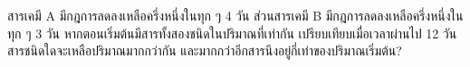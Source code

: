 ﻿%
\question สารเคมี A มีกฎการลดลงเหลือครึ่งหนึ่งในทุก ๆ 4 วัน ส่วนสารเคมี B มีกฎการลดลงเหลือครึ่งหนึ่งในทุก ๆ 3 วัน หากตอนเริ่มต้นมีสารทั้งสองชนิดในปริมาณที่เท่ากัน เปรียบเทียบเมื่อเวลาผ่านไป 12 วัน สารชนิดใดจะเหลือปริมาณมากกว่ากัน และมากกว่าอีกสารนึงอยู่กี่เท่าของปริมาณเริ่มต้น?
\newline
{}
